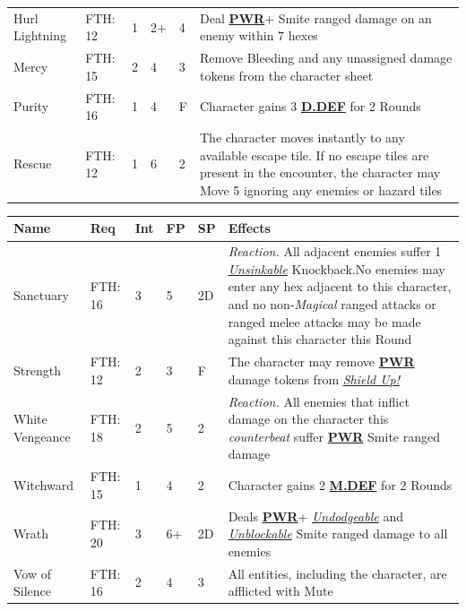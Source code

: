\documentclass[12pt]{article}
\newcommand{\refto}[1]{\hyperlink{#1}{\textbf{#1}}}
\newcommand{\reftoit}[1]{\hyperlink{#1}{\emph{#1}}}
\begin{document}
\begin{center}
\begin{tabularx}{\textwidth}{p{}p{}p{}p{}p{}p{}}
Hurl Lightning & FTH: 12 & 1 & 2+ & 4 & Deal \refto{PWR}+ Smite ranged damage on an enemy within 7 hexes \\
Mercy & FTH: 15 & 2 & 4 & 3 & Remove Bleeding and any unassigned damage tokens from the character sheet \\
Purity & FTH: 16 & 1 & 4 & F & Character gains 3 \refto{D.DEF} for 2 Rounds \\
Rescue & FTH: 12 & 1 & 6 & 2 & The character moves instantly to any available escape tile. If no escape tiles are present in the encounter, the character may Move 5 ignoring any enemies or hazard tiles \\
\hline
\end{tabularx}
\end{center}

\pagebreak

\begin{center}
\begin{tabularx}{\textwidth}{p{}p{}p{}p{}p{}p{}}
\hline
\textbf{Name} & \textbf{Req} & \textbf{Int} & \textbf{FP} & \textbf{SP} & \textbf{Effects} \\
\hline
Sanctuary & FTH: 16 & 3 & 5 & 2D & \emph{Reaction.} All adjacent enemies suffer 1 \reftoit{Unsinkable} Knockback.\newline No enemies may enter any hex adjacent to this character, and no non-\emph{Magical} ranged attacks or ranged melee attacks may be made against this character this Round \\
Strength & FTH: 12 & 2 & 3 & F & The character may remove \refto{PWR} damage tokens from \reftoit{Shield Up!} \\
White Vengeance & FTH: 18 & 2 & 5 & 2 & \emph{Reaction.} All enemies that inflict damage on the character this \emph{counterbeat} suffer \refto{PWR} Smite ranged damage\\
Witchward & FTH: 15 & 1 & 4 & 2 & Character gains 2 \refto{M.DEF} for 2 Rounds\\
Wrath & FTH: 20 & 3 & 6+ & 2D & Deals \refto{PWR}+ \reftoit{Undodgeable} and \reftoit{Unblockable} Smite ranged damage to all enemies \\
Vow of Silence & FTH: 16 & 2 & 4 & 3 & All entities, including the character, are afflicted with Mute\\
\hline
\end{tabularx}
\end{center}

\pagebreak
\end{document}
